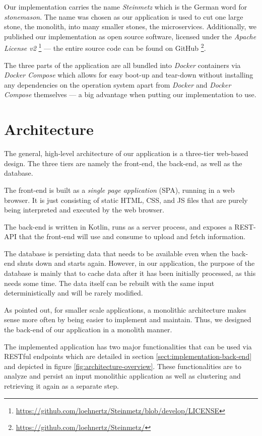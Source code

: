 \documentclass[12pt,a4paper]{report}
\begin{document}
Our implementation carries the name \textit{Steinmetz} which is the German
word for \textit{stonemason}. The name was chosen as our application is used
to cut one large stone, the monolith, into many smaller stones, the microservices.
Additionally, we published our implementation as open source software,
licensed under the \textit{Apache License v2}
\footnote{\url{https://github.com/loehnertz/Steinmetz/blob/develop/LICENSE}} ---
the entire source code can be found on GitHub
\footnote{\url{https://github.com/loehnertz/Steinmetz/}}.

The three parts of the application are all bundled into \textit{Docker} containers
via \textit{Docker Compose} which allows for easy boot-up and tear-down without
installing any dependencies on the operation system apart from \textit{Docker}
and \textit{Docker Compose} themselves \cite{docker} \cite{docker-compose} ---
a big advantage when putting our implementation to use.



\section{Architecture}
The general, high-level architecture of our application is a three-tier
web-based design. The three tiers are namely the front-end, the back-end,
as well as the database.

The front-end is built as a \textit{single page application} (SPA),
running in a web browser. It is just consisting of static HTML, CSS, and JS files
that are purely being interpreted and executed by the web browser.

The back-end is written in Kotlin, runs as a server process, and exposes
a REST-API that the front-end will use and consume to upload and fetch information.

The database is persisting data that needs to be available even when the
back-end shuts down and starts again. However, in our application,
the purpose of the database is mainly that to cache data after it has
been initially processed, as this needs some time. The data itself can be
rebuilt with the same input deterministically and will be rarely modified.

As pointed out, for smaller scale applications, a monolithic architecture
makes sense more often by being easier to implement and maintain.
Thus, we designed the back-end of our application in a monolith manner.

The implemented application has two major functionalities that can be used
via RESTful endpoints which are detailed in section \ref{sect:implementation-back-end}
and depicted in figure \ref{fig:architecture-overview}.
These functionalities are to analyze and persist an input monolithic application
as well as clustering and retrieving it again as a separate step.
\end{document}
